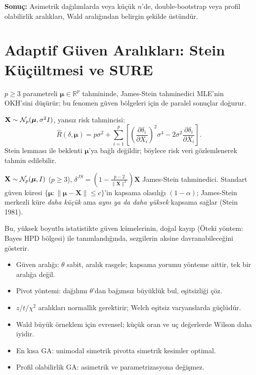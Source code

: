 \noindent\textbf{Sonuç:} Asimetrik dağılımlarda veya küçük $n$'de, double-bootstrap veya profil olabilirlik aralıkları, Wald aralığından belirgin şekilde üstündür.

\section{Adaptif Güven Aralıkları: Stein Küçültmesi ve SURE}
\label{sec:adaptif_ga}

$p\geq3$ parametreli $\boldsymbol\mu\in\mathbb{R}^p$ tahmininde, James-Stein tahminedici MLE'nin OKH'sini düşürür; bu fenomen güven bölgeleri için de paralel sonuçlar doğurur.

\begin{tanim}
$\mathbf{X}\sim\mathcal{N}_p(\boldsymbol\mu,\sigma^2I)$, yansız risk tahmincisi:
\[
  \widehat{R}(\delta,\boldsymbol\mu) = p\sigma^2 + \sum_{i=1}^p\left[\left(\frac{\partial\delta_i}{\partial X_i}\right)^2\sigma^4 - 2\sigma^2\frac{\partial\delta_i}{\partial X_i}\right].
\]
Stein lemması ile beklenti $\boldsymbol\mu$'ya bağlı değildir; böylece risk veri gözlemlenerek tahmin edilebilir.
\end{tanim}

\begin{teorem}
$\mathbf{X}\sim\mathcal{N}_p(\boldsymbol\mu,I)$ ($p\geq3$), $\delta^{JS}=\left(1-\frac{p-2}{\|\mathbf{X}\|^2}\right)\mathbf{X}$ James-Stein tahminedici. Standart güven küresi $\{\boldsymbol\mu:\|\boldsymbol\mu-\mathbf{X}\|\leq c\}$'in kapsama olasılığı $(1-\alpha)$; James-Stein merkezli küre \emph{daha küçük} ama \emph{aynı ya da daha yüksek} kapsama sağlar (Stein 1981).
\end{teorem}

Bu, yüksek boyutlu istatistikte güven kümelerinin, doğal kayıp (Öteki yöntem: Bayes HPD bölgesi) ile tanımlandığında, sezgilerin aksine davranabileceğini gösterir.


\begin{mikroozet}
\begin{itemize}
  \item Güven aralığı: $\theta$ sabit, aralık rasgele; kapsama yorumu yönteme aittir, tek bir aralığa değil.
  \item Pivot yöntemi: dağılımı $\theta$'dan bağımsız büyüklük bul, eşitsizliği çöz.
  \item $z$/$t$/$\chi^2$ aralıkları normallik gerektirir; Welch eşitsiz varyanslarda güçlüdür.
  \item Wald büyük örneklem için evrensel; küçük oran ve uç değerlerde Wilson daha iyidir.
  \item En kısa GA: unimodal simetrik pivotta simetrik kesimler optimal.
  \item Profil olabilirlik GA: asimetrik ve parametrizasyona değişmez.
\end{itemize}
\end{mikroozet}

